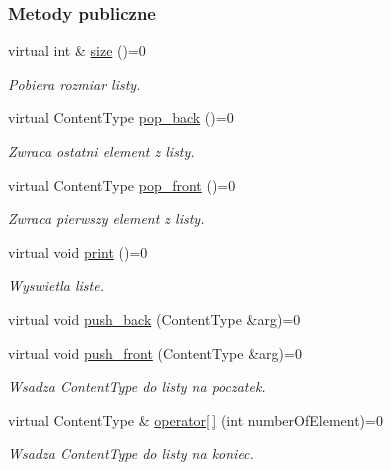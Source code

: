 \subsubsection*{Metody publiczne}
\begin{DoxyCompactItemize}
\item 
virtual int \& \hyperlink{class_list_a61bc4a0a8a2103d503f88b79d758f271}{size} ()=0
\begin{DoxyCompactList}\small\item\em Pobiera rozmiar listy. \end{DoxyCompactList}\item 
virtual Content\-Type \hyperlink{class_list_a3d0a41deda48ee401b45d4c74ad7f3fb}{pop\-\_\-back} ()=0
\begin{DoxyCompactList}\small\item\em Zwraca ostatni element z listy. \end{DoxyCompactList}\item 
virtual Content\-Type \hyperlink{class_list_abfc64c5f02d6aca4140e626c03ac8f7c}{pop\-\_\-front} ()=0
\begin{DoxyCompactList}\small\item\em Zwraca pierwszy element z listy. \end{DoxyCompactList}\item 
virtual void \hyperlink{class_list_ae9cd658323024b4fa3ce3be616d17f33}{print} ()=0
\begin{DoxyCompactList}\small\item\em Wyswietla liste. \end{DoxyCompactList}\item 
virtual void \hyperlink{class_list_aebfb58526e594d251d95d1a43bfa2edd}{push\-\_\-back} (Content\-Type \&arg)=0
\item 
virtual void \hyperlink{class_list_a2040f9141e0f48783aed547d7209904c}{push\-\_\-front} (Content\-Type \&arg)=0
\begin{DoxyCompactList}\small\item\em Wsadza Content\-Type do listy na poczatek. \end{DoxyCompactList}\item 
virtual Content\-Type \& \hyperlink{class_list_a85def545ed784186bc1cc8f47c80296e}{operator\mbox{[}$\,$\mbox{]}} (int number\-Of\-Element)=0
\begin{DoxyCompactList}\small\item\em Wsadza Content\-Type do listy na koniec. \end{DoxyCompactList}\item 

\end{DoxyCompactItemize}
